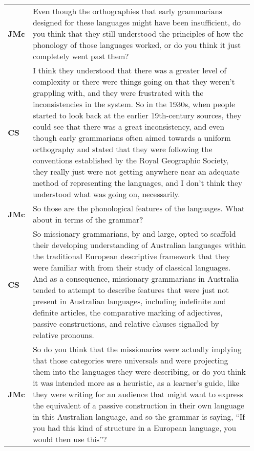 \documentclass[12pt]{article}
\begin{document}
\begin{flushleft}
\begin{supertabular}{m{0.24415985in}m{5.89766in}}
\textbf{JMc}\newline
 &
Even though the orthographies that early grammarians designed for these languages might have been insufficient, do you think that they still understood the principles of how the phonology of those languages worked, or do you think it just completely went past them?\\
\textbf{CS}\newline
 &
I think they understood that there was a greater level of complexity or there were things going on that they weren’t grappling with, and they were frustrated with the inconsistencies in the system. So in the 1930s, when people started to look back at the earlier 19th-century sources, they could see that there was a great inconsistency, and even though early grammarians often aimed towards a uniform orthography and stated that they were following the conventions established by the Royal Geographic Society, they really just were not getting anywhere near an adequate method of representing the languages, and I don’t think they understood what was going on, necessarily.\\
\textbf{JMc}\newline
 &
So those are the phonological features of the languages. What about in terms of the grammar?\\
\textbf{CS}\newline
 &
So missionary grammarians, by and large, opted to scaffold their developing understanding of Australian languages within the traditional European descriptive framework that they were familiar with from their study of classical languages. And as a consequence, missionary grammarians in Australia tended to attempt to describe features that were just not present in Australian languages, including indefinite and definite articles, the comparative marking of adjectives, passive constructions, and relative clauses signalled by relative pronouns.\\
\textbf{JMc}\newline
 &
So do you think that the missionaries were actually implying that those categories were universals and were projecting them into the languages they were describing, or do you think it was intended more as a heuristic, as a learner’s guide, like they were writing for an audience that might want to express the equivalent of a passive construction in their own language in this Australian language, and so the grammar is saying, “If you had this kind of structure in a European language, you would then use this”?\\

\end{supertabular}
\end{flushleft}
\end{document}
